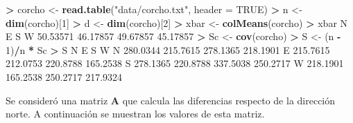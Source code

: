 \documentclass[
  a4paper,
  oneside]{scrbook}
\newenvironment{Shaded}{\begin{snugshade}}{\end{snugshade}}
\newcommand{\AttributeTok}[1]{\textcolor[rgb]{0.13,0.29,0.53}{#1}}
\newcommand{\ConstantTok}[1]{\textcolor[rgb]{0.56,0.35,0.01}{#1}}
\newcommand{\DecValTok}[1]{\textcolor[rgb]{0.00,0.00,0.81}{#1}}
\newcommand{\FloatTok}[1]{\textcolor[rgb]{0.00,0.00,0.81}{#1}}
\newcommand{\FunctionTok}[1]{\textcolor[rgb]{0.13,0.29,0.53}{\textbf{#1}}}
\newcommand{\NormalTok}[1]{#1}
\newcommand{\OtherTok}[1]{\textcolor[rgb]{0.56,0.35,0.01}{#1}}
\newcommand{\SpecialCharTok}[1]{\textcolor[rgb]{0.81,0.36,0.00}{\textbf{#1}}}
\newcommand{\StringTok}[1]{\textcolor[rgb]{0.31,0.60,0.02}{#1}}
\theoremstyle{definition}
\theoremstyle{definition}
\theoremstyle{definition}
\theoremstyle{definition}
\theoremstyle{remark}
\begin{document}
\footnotesize

\begin{Shaded}
\begin{Highlighting}[]
\SpecialCharTok{\textgreater{}}\NormalTok{ corcho }\OtherTok{\textless{}{-}} \FunctionTok{read.table}\NormalTok{(}\StringTok{"data/corcho.txt"}\NormalTok{, }\AttributeTok{header =} \ConstantTok{TRUE}\NormalTok{)}
\SpecialCharTok{\textgreater{}}\NormalTok{ n }\OtherTok{\textless{}{-}} \FunctionTok{dim}\NormalTok{(corcho)[}\DecValTok{1}\NormalTok{]}
\SpecialCharTok{\textgreater{}}\NormalTok{ d }\OtherTok{\textless{}{-}} \FunctionTok{dim}\NormalTok{(corcho)[}\DecValTok{2}\NormalTok{]}
\SpecialCharTok{\textgreater{}}\NormalTok{ xbar }\OtherTok{\textless{}{-}} \FunctionTok{colMeans}\NormalTok{(corcho)}
\SpecialCharTok{\textgreater{}}\NormalTok{ xbar}
\NormalTok{       N        E        S        W }
\FloatTok{50.53571} \FloatTok{46.17857} \FloatTok{49.67857} \FloatTok{45.17857} 
\SpecialCharTok{\textgreater{}}\NormalTok{ Sc }\OtherTok{\textless{}{-}} \FunctionTok{cov}\NormalTok{(corcho)}
\SpecialCharTok{\textgreater{}}\NormalTok{ S }\OtherTok{\textless{}{-}}\NormalTok{ (n }\SpecialCharTok{{-}} \DecValTok{1}\NormalTok{)}\SpecialCharTok{/}\NormalTok{n }\SpecialCharTok{*}\NormalTok{ Sc}
\SpecialCharTok{\textgreater{}}\NormalTok{ S}
\NormalTok{         N        E        S        W}
\NormalTok{N }\FloatTok{280.0344} \FloatTok{215.7615} \FloatTok{278.1365} \FloatTok{218.1901}
\NormalTok{E }\FloatTok{215.7615} \FloatTok{212.0753} \FloatTok{220.8788} \FloatTok{165.2538}
\NormalTok{S }\FloatTok{278.1365} \FloatTok{220.8788} \FloatTok{337.5038} \FloatTok{250.2717}
\NormalTok{W }\FloatTok{218.1901} \FloatTok{165.2538} \FloatTok{250.2717} \FloatTok{217.9324}
\end{Highlighting}
\end{Shaded}

\normalsize

Se consideró una matriz \(\bm{A}\) que calcula las diferencias respecto de
la dirección norte. A continuación se muestran los valores de esta
matriz.

\footnotesize
\end{document}
